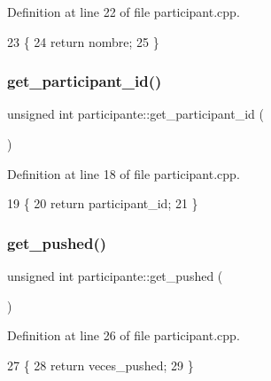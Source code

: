 Definition at line 22 of file participant.\+cpp.


\begin{DoxyCode}
23 \{
24         \textcolor{keywordflow}{return} nombre;
25 \}
\end{DoxyCode}
\mbox{\label{classparticipante_a7bf312844c7814bcaaf6b20466a16283}} 
\subsubsection{\texorpdfstring{get\+\_\+participant\+\_\+id()}{get\_participant\_id()}}
{\footnotesize\ttfamily unsigned int participante\+::get\+\_\+participant\+\_\+id (\begin{DoxyParamCaption}{ }\end{DoxyParamCaption})}



Definition at line 18 of file participant.\+cpp.


\begin{DoxyCode}
19 \{
20         \textcolor{keywordflow}{return} participant\_id;
21 \}
\end{DoxyCode}
\mbox{\label{classparticipante_a5bd7015af88db27e170a724ff38148c9}} 
\subsubsection{\texorpdfstring{get\+\_\+pushed()}{get\_pushed()}}
{\footnotesize\ttfamily unsigned int participante\+::get\+\_\+pushed (\begin{DoxyParamCaption}{ }\end{DoxyParamCaption})}



Definition at line 26 of file participant.\+cpp.


\begin{DoxyCode}
27 \{
28         \textcolor{keywordflow}{return} veces\_pushed;
29 \}
\end{DoxyCode}
\mbox{\label{classparticipante_aeba4c21aed4c6011b46b13732ccc25df}} 
